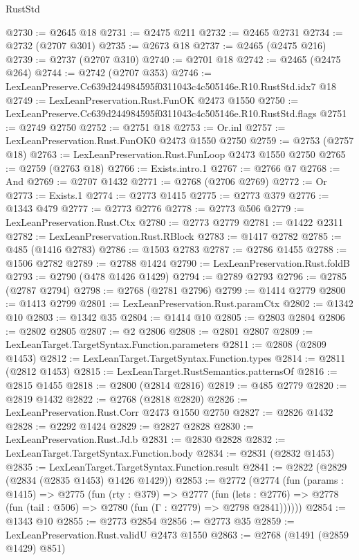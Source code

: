 \begin{lexlean}{RustStd}
\begin{coremodule}
@2730 := @2645 @18
@2731 := @2475 @211
@2732 := @2465 @2731
@2734 := @2732 (@2707 @301)
@2735 := @2673 @18
@2737 := @2465 (@2475 @216)
@2739 := @2737 (@2707 @310)
@2740 := @2701 @18
@2742 := @2465 (@2475 @264)
@2744 := @2742 (@2707 @353)
@2746 := LexLeanPreserve.Cc639d244984595f0311043c4c505146e.R10.RustStd.idx7 @18
@2749 := LexLeanPreservation.Rust.FunOK @2473 @1550
@2750 := LexLeanPreserve.Cc639d244984595f0311043c4c505146e.R10.RustStd.flags
@2751 := @2749 @2750
@2752 := @2751 @18
@2753 := Or.inl
@2757 := LexLeanPreservation.Rust.FunOK0 @2473 @1550 @2750
@2759 := @2753 (@2757 @18)
@2763 := LexLeanPreservation.Rust.FunLoop @2473 @1550 @2750
@2765 := @2759 (@2763 @18)
@2766 := Exists.intro.{1}
@2767 := @2766 @7
@2768 := And
@2769 := @2707 @1432
@2771 := @2768 (@2706 @2769)
@2772 := Or
@2773 := Exists.{1}
@2774 := @2773 @1415
@2775 := @2773 @379
@2776 := @1343 @479
@2777 := @2773 @2776
@2778 := @2773 @506
@2779 := LexLeanPreservation.Rust.Ctx
@2780 := @2773 @2779
@2781 := @1422 @2311
@2782 := LexLeanPreservation.Rust.RBlock
@2783 := @1417 @2782
@2785 := @485 (@1416 @2783)
@2786 := @1503 @2783
@2787 := @2786 @1455
@2788 := @1506 @2782
@2789 := @2788 @1424
@2790 := LexLeanPreservation.Rust.foldB
@2793 := @2790 (@478 @1426 @1429)
@2794 := @2789 @2793
@2796 := @2785 (@2787 @2794)
@2798 := @2768 (@2781 @2796)
@2799 := @1414 @2779
@2800 := @1413 @2799
@2801 := LexLeanPreservation.Rust.paramCtx
@2802 := @1342 @10
@2803 := @1342 @35
@2804 := @1414 @10
@2805 := @2803 @2804
@2806 := @2802 @2805
@2807 := @2 @2806
@2808 := @2801 @2807
@2809 := LexLeanTarget.TargetSyntax.Function.parameters
@2811 := @2808 (@2809 @1453)
@2812 := LexLeanTarget.TargetSyntax.Function.types
@2814 := @2811 (@2812 @1453)
@2815 := LexLeanTarget.RustSemantics.patternsOf
@2816 := @2815 @1455
@2818 := @2800 (@2814 @2816)
@2819 := @485 @2779
@2820 := @2819 @1432
@2822 := @2768 (@2818 @2820)
@2826 := LexLeanPreservation.Rust.Corr @2473 @1550 @2750
@2827 := @2826 @1432
@2828 := @2292 @1424
@2829 := @2827 @2828
@2830 := LexLeanPreservation.Rust.Jd.b
@2831 := @2830 @2828
@2832 := LexLeanTarget.TargetSyntax.Function.body
@2834 := @2831 (@2832 @1453)
@2835 := LexLeanTarget.TargetSyntax.Function.result
@2841 := @2822 (@2829 (@2834 (@2835 @1453) @1426 @1429))
@2853 := @2772
    (@2774
      (fun (params : @1415) =>
      @2775
        (fun (rty : @379) =>
        @2777
          (fun (lets : @2776) =>
          @2778 (fun (tail : @506) => @2780 (fun (Γ : @2779) => @2798 @2841))))))
@2854 := @1343 @10
@2855 := @2773 @2854
@2856 := @2773 @35
@2859 := LexLeanPreservation.Rust.validU @2473 @1550
@2863 := @2768 (@1491 (@2859 @1429) @851)

\end{coremodule}
\end{lexlean}
